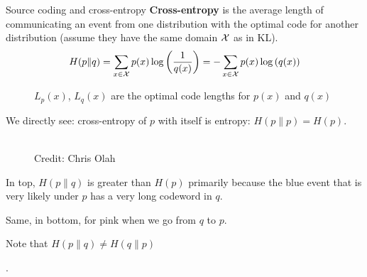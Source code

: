\documentclass[11pt,compress,t,notes=noshow, xcolor=table]{beamer}
\begin{document}
\begin{vbframe} {Source coding and cross-entropy}
\framebreak
\textbf{Cross-entropy} is the average length of communicating an event from one distribution with the optimal code for another distribution (assume they have the same domain $\mathcal{X}$ as in KL).
  $$ H(p \| q) = \sum_{x \in \mathcal{X}} p(x) \log\left(\frac{1}{q(x)}\right) = - \sum_{x \in \mathcal{X}} p(x) \log\left(q(x)\right) $$

\begin{figure}
    \centering
      \caption{\footnotesize{$L_p(x)$, $L_q(x)$ are the optimal code lengths for $p(x)$ and $q(x)$}}
  \end{figure}
  
We directly see: cross-entropy of $p$ with itself is entropy: $H(p \| p) = H(p)$.
  
\framebreak
  \begin{figure}
    \centering
      \tiny{\\ Credit: Chris Olah}
  \end{figure}
  
  \begin{itemize}
    \item \small{In top, $H(p \| q)$ is greater than $H(p)$ primarily because the blue event that is very likely under $p$ has a very long codeword in $q$.
    \item Same, in bottom, for pink when we go from $q$ to $p$.
    \item Note that $H(p \| q) \neq H(q \| p)$}. 
  \end{itemize}


\end{vbframe}
\end{document}
